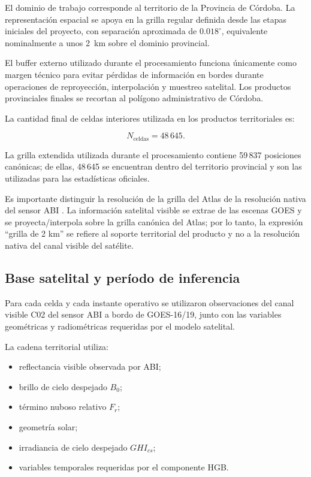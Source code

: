 \documentclass[11pt,a4paper]{article}
\begin{document}
El dominio de trabajo corresponde al territorio de la Provincia de Córdoba. La representación espacial se apoya en la grilla regular definida desde las etapas iniciales del proyecto, con separación aproximada de $0.018^\circ$, equivalente nominalmente a unos 2~km sobre el dominio provincial.

El buffer externo utilizado durante el procesamiento funciona únicamente como margen técnico para evitar pérdidas de información en bordes durante operaciones de reproyección, interpolación y muestreo satelital. Los productos provinciales finales se recortan al polígono administrativo de Córdoba.

La cantidad final de celdas interiores utilizada en los productos territoriales es:

\[
N_{\text{celdas}} = 48\,645.
\]

La grilla extendida utilizada durante el procesamiento contiene 59\,837 posiciones canónicas; de ellas, 48\,645 se encuentran dentro del territorio provincial y son las utilizadas para las estadísticas oficiales.

Es importante distinguir la resolución de la grilla del Atlas de la resolución nativa del sensor ABI \cite{schmit2017}. La información satelital visible se extrae de las escenas GOES y se proyecta/interpola sobre la grilla canónica del Atlas; por lo tanto, la expresión ``grilla de 2 km'' se refiere al soporte territorial del producto y no a la resolución nativa del canal visible del satélite.

\subsection{Base satelital y período de inferencia}

Para cada celda y cada instante operativo se utilizaron observaciones del canal visible C02 del sensor ABI a bordo de GOES-16/19, junto con las variables geométricas y radiométricas requeridas por el modelo satelital.

La cadena territorial utiliza:

\begin{itemize}
    \item reflectancia visible observada por ABI;
    \item brillo de cielo despejado $B_0$;
    \item término nuboso relativo $F_r$;
    \item geometría solar;
    \item irradiancia de cielo despejado $GHI_{cs}$;
    \item variables temporales requeridas por el componente HGB.
\end{itemize}
\end{document}
